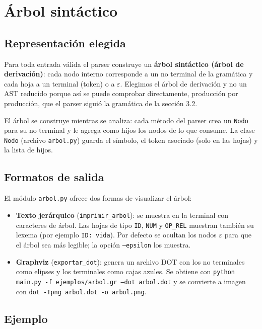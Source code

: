 \section{Árbol sintáctico}

\subsection{Representación elegida}

Para toda entrada válida el parser construye un \textbf{árbol sintáctico (árbol de derivación)}: cada nodo interno corresponde a un no terminal de la gramática y cada hoja a un terminal (token) o a $\varepsilon$. Elegimos el árbol de derivación y no un AST reducido porque así se puede comprobar directamente, producción por producción, que el parser siguió la gramática de la sección 3.2.

El árbol se construye mientras se analiza: cada método del parser crea un \texttt{Nodo} para su no terminal y le agrega como hijos los nodos de lo que consume. La clase \texttt{Nodo} (archivo \texttt{arbol.py}) guarda el símbolo, el token asociado (solo en las hojas) y la lista de hijos.

\subsection{Formatos de salida}

El módulo \texttt{arbol.py} ofrece dos formas de visualizar el árbol:

\begin{itemize}
    \item \textbf{Texto jerárquico} (\texttt{imprimir\_arbol}): se muestra en la terminal con caracteres de árbol. Las hojas de tipo \texttt{ID}, \texttt{NUM} y \texttt{OP\_REL} muestran también su lexema (por ejemplo \texttt{ID: vida}). Por defecto se ocultan los nodos $\varepsilon$ para que el árbol sea más legible; la opción \texttt{--epsilon} los muestra.
    \item \textbf{Graphviz} (\texttt{exportar\_dot}): genera un archivo DOT con los no terminales como elipses y los terminales como cajas azules. Se obtiene con \texttt{python main.py -f ejemplos/arbol.gr --dot arbol.dot} y se convierte a imagen con \texttt{dot -Tpng arbol.dot -o arbol.png}.
\end{itemize}

\subsection{Ejemplo}

